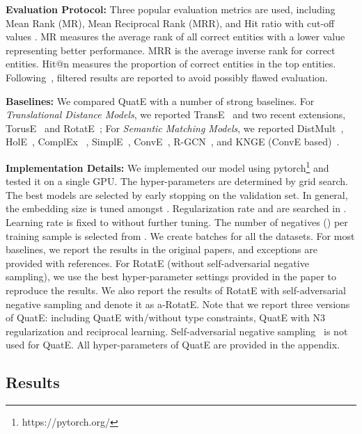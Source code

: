 \documentclass{article}
\begin{document}
\textbf{Evaluation Protocol:} Three popular evaluation metrics are used, including Mean Rank (MR), Mean Reciprocal Rank (MRR), and Hit ratio with cut-off values . MR measures the average rank of all correct entities with a lower value representing better performance. MRR is the average inverse rank for correct entities. Hit@n measures the proportion of correct entities in the top  entities. Following~\citet{bordes2013translating}, filtered results are reported to avoid possibly flawed evaluation.

\textbf{Baselines:} We compared QuatE with a number of strong baselines. For \textit{Translational Distance Models}, we reported TransE~\citep{bordes2013translating} and two recent extensions, TorusE~\citep{ebisu2018toruse} and RotatE~\citep{sun2019rotate}; For \textit{Semantic Matching Models}, we reported DistMult~\citep{yang2014embedding}, HolE~\citep{nickel2016holographic}, ComplEx~\citep{trouillon2016complex} , SimplE~\citep{kazemi2018simple}, ConvE~\citep{dettmers2018convolutional}, R-GCN~\citep{schlichtkrull2018modeling}, and KNGE (ConvE based)~\citep{wang2018knowledge}.

\textbf{Implementation Details:} We implemented our model using pytorch\footnote{https://pytorch.org/} and tested it on a single GPU. The hyper-parameters are determined by grid search. The best models are selected by early stopping on the validation set. In general, the embedding size  is tuned amongst . Regularization rate  and  are searched in . Learning rate is fixed to  without further tuning. The number of negatives () per training sample is selected from . We create  batches for all the datasets. For most baselines, we report the results in the original papers, and exceptions are provided with references. For RotatE (without self-adversarial negative sampling), we use the best hyper-parameter settings provided in the paper to reproduce the results. We also report the results of RotatE with self-adversarial negative sampling and denote it as a-RotatE. Note that we report three versions of QuatE: including QuatE with/without type constraints, QuatE with N3 regularization and reciprocal learning. Self-adversarial negative sampling~\citep{sun2019rotate} is not used for QuatE. All hyper-parameters of QuatE are provided in the appendix.

\subsection{Results}
\end{document}
